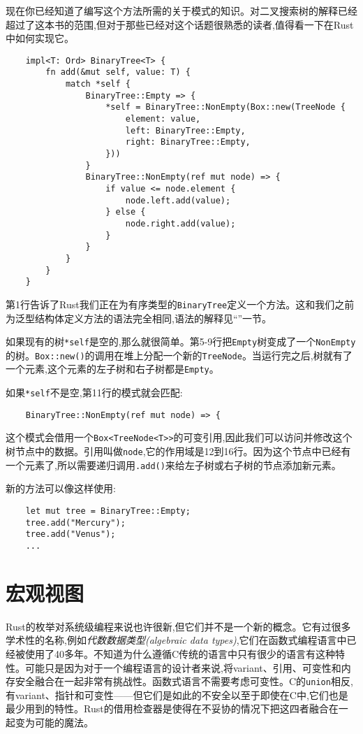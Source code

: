 现在你已经知道了编写这个方法所需的关于模式的知识。对二叉搜索树的解释已经超过了这本书的范围,但对于那些已经对这个话题很熟悉的读者,值得看一下在Rust中如何实现它。

\begin{verbatim}
    impl<T: Ord> BinaryTree<T> {
        fn add(&mut self, value: T) {
            match *self {
                BinaryTree::Empty => {
                    *self = BinaryTree::NonEmpty(Box::new(TreeNode {
                        element: value,
                        left: BinaryTree::Empty,
                        right: BinaryTree::Empty,
                    }))
                }
                BinaryTree::NonEmpty(ref mut node) => {
                    if value <= node.element {
                        node.left.add(value);
                    } else {
                        node.right.add(value);
                    }
                }
            }
        }
    }    
\end{verbatim}

第1行告诉了Rust我们正在为有序类型的\texttt{BinaryTree}定义一个方法。这和我们之前为泛型结构体定义方法的语法完全相同,语法的解释见“”一节。

如果现有的树\texttt{*self}是空的,那么就很简单。第5-9行把\texttt{Empty}树变成了一个\texttt{NonEmpty}的树。\texttt{Box::new()}的调用在堆上分配一个新的\texttt{TreeNode}。当运行完之后,树就有了一个元素,这个元素的左子树和右子树都是\texttt{Empty}。

如果\texttt{*self}不是空,第11行的模式就会匹配:
\begin{verbatim}
    BinaryTree::NonEmpty(ref mut node) => {
\end{verbatim}

这个模式会借用一个\texttt{Box<TreeNode<T>>}的可变引用,因此我们可以访问并修改这个树节点中的数据。引用叫做\texttt{node},它的作用域是12到16行。因为这个节点中已经有一个元素了,所以需要递归调用\texttt{.add()}来给左子树或右子树的节点添加新元素。

新的方法可以像这样使用:
\begin{verbatim}
    let mut tree = BinaryTree::Empty;
    tree.add("Mercury");
    tree.add("Venus");
    ...
\end{verbatim}

\section{宏观视图}

Rust的枚举对系统级编程来说也许很新,但它们并不是一个新的概念。它有过很多学术性的名称,例如\emph{代数数据类型(algebraic data types)},它们在函数式编程语言中已经被使用了40多年。不知道为什么遵循C传统的语言中只有很少的语言有这种特性。可能只是因为对于一个编程语言的设计者来说,将variant、引用、可变性和内存安全融合在一起非常有挑战性。函数式语言不需要考虑可变性。C的\texttt{union}相反,有variant、指针和可变性——但它们是如此的不安全以至于即使在C中,它们也是最少用到的特性。Rust的借用检查器是使得在不妥协的情况下把这四者融合在一起变为可能的魔法。

